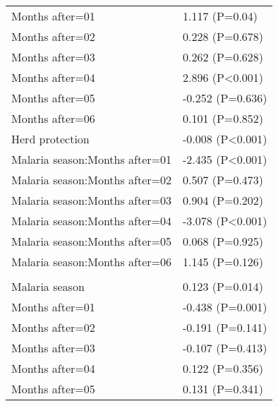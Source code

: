 \documentclass[]{article}
\begin{document}
\begin{longtable}[t]{ll}
\hspace{1em}Months after=01 & 1.117 (P=0.04)\\
\hspace{1em}Months after=02 & 0.228 (P=0.678)\\
\hspace{1em}Months after=03 & 0.262 (P=0.628)\\
\hspace{1em}Months after=04 & 2.896 (P<0.001)\\
\hspace{1em}Months after=05 & -0.252 (P=0.636)\\
\hspace{1em}Months after=06 & 0.101 (P=0.852)\\
\hspace{1em}Herd protection & -0.008 (P<0.001)\\
\hspace{1em}Malaria season:Months after=01 & -2.435 (P<0.001)\\
\hspace{1em}Malaria season:Months after=02 & 0.507 (P=0.473)\\
\hspace{1em}Malaria season:Months after=03 & 0.904 (P=0.202)\\
\hspace{1em}Malaria season:Months after=04 & -3.078 (P<0.001)\\
\hspace{1em}Malaria season:Months after=05 & 0.068 (P=0.925)\\
\hspace{1em}Malaria season:Months after=06 & 1.145 (P=0.126)\\
\addlinespace[1.5em]
\multicolumn{2}{l}{\textbf{Temporary field worker}}\\
\hspace{1em}Malaria season & 0.123 (P=0.014)\\
\hspace{1em}Months after=01 & -0.438 (P=0.001)\\
\hspace{1em}Months after=02 & -0.191 (P=0.141)\\
\hspace{1em}Months after=03 & -0.107 (P=0.413)\\
\hspace{1em}Months after=04 & 0.122 (P=0.356)\\
\hspace{1em}Months after=05 & 0.131 (P=0.341)\\

\end{longtable}
\end{document}

